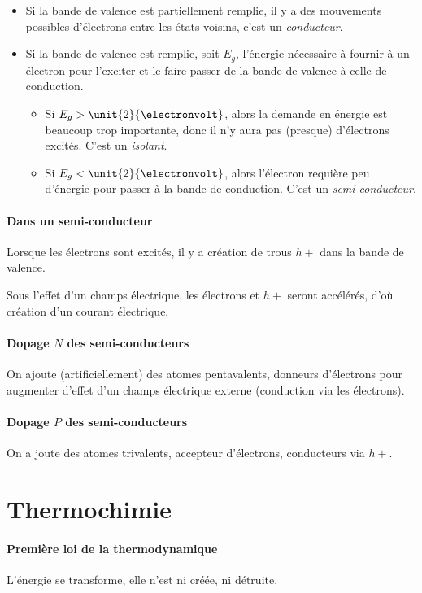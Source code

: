 \documentclass[11pt,a4paper,french]{article}
\begin{document}
\begin{itemize}
	\item Si la bande de valence est partiellement remplie, il y a des mouvements possibles d'électrons entre les états voisins, c'est un {\em conducteur}.
	\item Si la bande de valence est remplie, soit $E_g$, l'énergie nécessaire à fournir à un électron pour l'exciter et le faire passer de la bande de valence à celle de conduction.
		\begin{itemize}
			\item Si $E_g > \unit{2}{\electronvolt}$, alors la demande en énergie est beaucoup trop importante, donc il n'y aura pas (presque) d'électrons excités. C'est un {\em isolant}.
			\item Si $E_g < \unit{2}{\electronvolt}$, alors l'électron requière peu d'énergie pour passer à la bande de conduction. C'est un {\em semi-conducteur}.
		\end{itemize}
\end{itemize}

\paragraph{Dans un semi-conducteur}
Lorsque les électrons sont excités, il y a création de trous $h+$ dans la bande de valence. %

Sous l'effet d'un champs électrique, les électrons et $h+$ seront accélérés, d'où création d'un courant électrique.

\paragraph{Dopage $N$ des semi-conducteurs}
On ajoute (artificiellement) des atomes pentavalents, donneurs d'électrons pour augmenter d'effet d'un champs électrique externe (conduction via les électrons).

\paragraph{Dopage $P$ des semi-conducteurs}
On a joute des atomes trivalents, accepteur d'électrons, conducteurs via $h+$.

\section{Thermochimie}

\paragraph{Première loi de la thermodynamique}
L'énergie se transforme, elle n'est ni créée, ni détruite.
\end{document}
